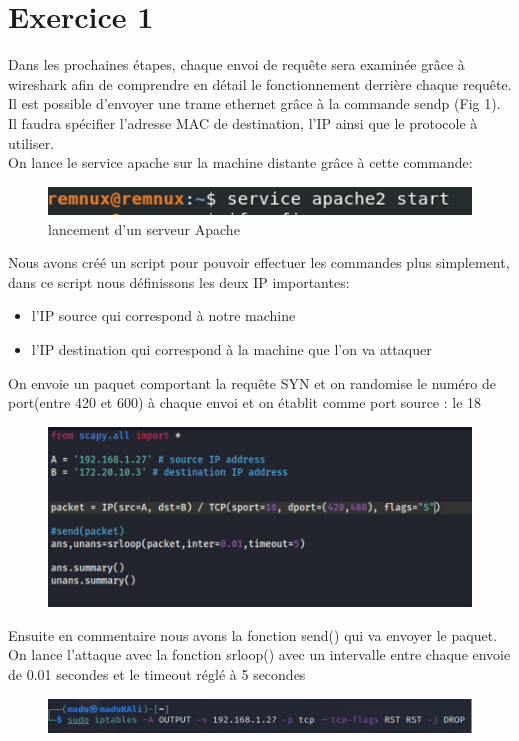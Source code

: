 \documentclass[12pt, oneside]{article}
\begin{document}
\section{Exercice 1}
Dans les prochaines étapes, chaque envoi de requête sera examinée grâce à wireshark afin de comprendre en détail le fonctionnement derrière chaque requête.
Il est possible d'envoyer une trame ethernet grâce à la commande sendp (Fig 1). Il faudra spécifier l'adresse MAC de destination, l'IP ainsi que le protocole à utiliser.\\
On lance le service apache sur la machine distante grâce à cette commande:
\begin{figure}[H]
\centering
\includegraphics[scale=0.7]{1}
\caption{lancement d'un serveur Apache}
\end{figure}
Nous avons créé un script pour pouvoir effectuer les commandes plus simplement, dans ce script nous définissons les deux IP importantes:
\begin{itemize}
\item l’IP source qui correspond à notre machine
\item l’IP destination qui correspond à la machine que l’on va attaquer
\end{itemize}
On envoie un paquet  comportant la requête SYN et on randomise le numéro de port(entre 420 et 600)  à chaque envoi et on établit comme port source : le 18
\begin{figure}[H]
\centering
\includegraphics[scale=0.7]{2}
\end{figure}
Ensuite en commentaire nous avons la fonction send() qui va envoyer le paquet.
On lance l’attaque avec la fonction srloop() avec un intervalle entre chaque envoie de 0.01 secondes et le timeout réglé à 5 secondes
\begin{figure}[H]
\centering
\includegraphics[scale=0.7]{3}
\end{figure}
\end{document}
